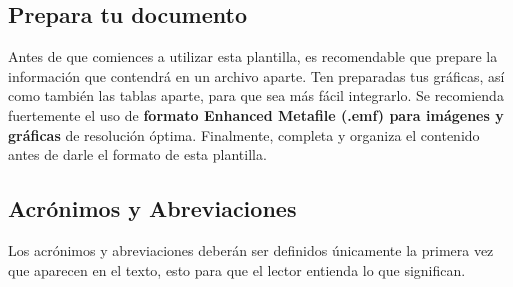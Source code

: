     \subsection{Prepara tu documento}
    
    Antes de que comiences a utilizar esta plantilla, es recomendable que prepare la información que contendrá en un archivo aparte. 
    Ten preparadas tus gráficas, así como también las tablas aparte, para que sea más fácil integrarlo. 
    Se recomienda fuertemente el uso de \textbf{formato Enhanced Metafile (.emf) para imágenes y gráficas} de resolución óptima. 
    Finalmente, completa y organiza el contenido antes de darle el formato de esta plantilla. 
    
    \subsection{Acrónimos y Abreviaciones}
    
    Los acrónimos y abreviaciones deberán ser definidos únicamente la primera vez que aparecen en el texto, esto para que el lector entienda lo que significan.
    
